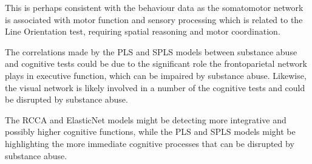 This is perhaps consistent with the behaviour data as the somatomotor network is associated with motor function and sensory processing which is related to the Line Orientation test, requiring spatial reasoning and motor coordination.

The correlations made by the PLS and SPLS models between substance abuse and cognitive tests could be due to the significant role the frontoparietal network plays in executive function, which can be impaired by substance abuse.
Likewise, the visual network is likely involved in a number of the cognitive tests and could be disrupted by substance abuse.

The RCCA and ElasticNet models might be detecting more integrative and possibly higher cognitive functions, while the PLS and SPLS models might be highlighting the more immediate cognitive processes that can be disrupted by substance abuse.

